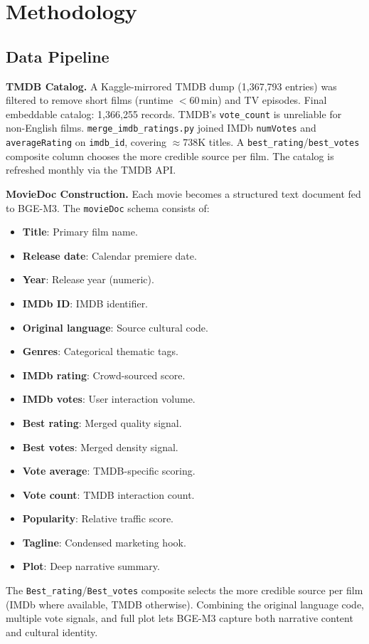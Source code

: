 \documentclass[conference]{IEEEtran}
\begin{document}
\FloatBarrier
\section{Methodology}
\label{sec:methodology}

\subsection{Data Pipeline}

\textbf{TMDB Catalog.}
A Kaggle-mirrored TMDB dump (1,367,793 entries) was filtered to remove
short films (runtime $<60$\,min) and TV episodes.
Final embeddable catalog: 1,366,255 records.
TMDB's \texttt{vote\_count} is unreliable for non-English films.
\texttt{merge\_imdb\_ratings.py} joined IMDb \texttt{numVotes} and
\texttt{averageRating} on \texttt{imdb\_id}, covering $\approx$738K titles.
A \texttt{best\_rating}/\texttt{best\_votes} composite column chooses
the more credible source per film.
The catalog is refreshed monthly via the TMDB API.

\textbf{MovieDoc Construction.}
Each movie becomes a structured text document fed to BGE-M3.
The \texttt{movieDoc} schema consists of:
\begin{itemize}
  \item \textbf{Title}: Primary film name.
  \item \textbf{Release date}: Calendar premiere date.
  \item \textbf{Year}: Release year (numeric).
  \item \textbf{IMDb ID}: IMDB identifier.
  \item \textbf{Original language}: Source cultural code.
  \item \textbf{Genres}: Categorical thematic tags.
  \item \textbf{IMDb rating}: Crowd-sourced score.
  \item \textbf{IMDb votes}: User interaction volume.
  \item \textbf{Best rating}: Merged quality signal.
  \item \textbf{Best votes}: Merged density signal.
  \item \textbf{Vote average}: TMDB-specific scoring.
  \item \textbf{Vote count}: TMDB interaction count.
  \item \textbf{Popularity}: Relative traffic score.
  \item \textbf{Tagline}: Condensed marketing hook.
  \item \textbf{Plot}: Deep narrative summary.
\end{itemize}
The \texttt{Best\_rating}/\texttt{Best\_votes} composite selects the
more credible source per film (IMDb where available, TMDB otherwise).
Combining the original language code, multiple vote signals, and full
plot lets BGE-M3 capture both narrative content and cultural identity.
\end{document}
